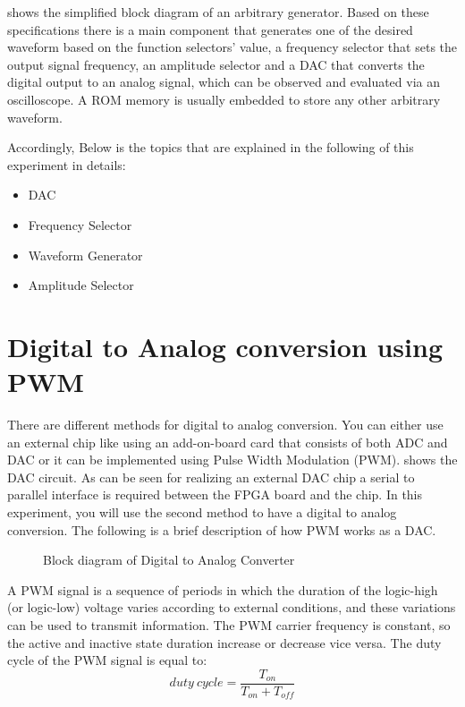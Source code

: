 \documentclass[12pt, logo=tehranDLDL/ut]{tehranDLDL}
\begin{document}
 shows the simplified block diagram of an arbitrary generator.
Based on these specifications there is
a main component that generates one of the desired waveform based on the function selectors’ value,
a frequency selector that sets the output signal frequency,
an amplitude selector
and a DAC that converts the digital output to an analog signal, which can be observed and evaluated via an oscilloscope.
A ROM memory is usually embedded to store any other arbitrary waveform.

Accordingly, Below is the topics that are explained in the following of this experiment in details:
\begin{itemize}
    \item DAC
    \item Frequency Selector
    \item Waveform Generator
    \item Amplitude Selector
\end{itemize}

\section{Digital to Analog conversion using PWM}

There are different methods for digital to analog conversion. You can either use an external chip like using an add-on-board card that consists of both ADC and DAC or it can be implemented using Pulse Width Modulation (PWM).
 shows the DAC circuit. As can be seen for realizing an external DAC chip a serial to parallel interface is required between the FPGA board and the chip. In this experiment, you will use the second method to have a digital to analog conversion. The following is a brief description of how PWM works as a DAC.

\begin{figure}
    \centering
    \caption{Block diagram of Digital to Analog Converter\label{fig:DACblockdia}}
    \resizebox{0.9\textwidth}{!}{}
\end{figure}

A PWM signal is a sequence of periods in which the duration of the logic-high (or logic-low) voltage varies according to external conditions, and these variations can be used to transmit information. The PWM carrier frequency is constant, so the active and inactive state duration increase or decrease vice versa. The duty cycle of the PWM signal is equal to:
$$\mathit{duty\ cycle} = \frac{T_\mathit{on}}{T_\mathit{on} + T_\mathit{off}}$$
\end{document}
